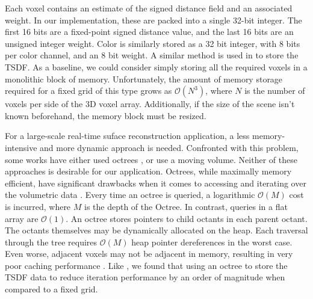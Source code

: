 \documentclass[conference]{IEEEtran}
\begin{document}
Each voxel contains an estimate of the signed distance field and an
associated weight. In our implementation, these are packed into a single 32-bit
integer. The first 16 bits are a fixed-point signed distance value, and the
last 16 bits  are an unsigned integer weight. Color is similarly
stored as a 32 bit integer, with 8 bits per color channel, and an 8 bit weight.
A similar method is used in \cite{Newcombe, Whelan2013, Bylow2013, NiessnerHashing} to store
the TSDF. As a baseline, we could consider simply storing all the required
voxels in a monolithic block of memory. Unfortunately, the amount of memory storage required
for a fixed grid of this type grows as $\mathcal{O}(N^3)$, where $N$ is the
number of voxels per side of the 3D voxel array. Additionally, if the size of
the scene isn't known beforehand, the memory block must be resized.


For a large-scale real-time suface reconstruction application, a less
memory-intensive and more dynamic approach is needed. Confronted with this
problem, some works have either used  octrees \cite{Wurm2010, Zeng2012,
Chen2012}, or use a moving volume\cite{Whelan2013}. Neither of these approaches
is desirable for our application. Octrees, while maximally memory efficient,
have significant drawbacks when it comes to accessing and iterating over the
volumetric data \cite{NiessnerHashing}. Every time an octree is queried,  a
logarithmic $\mathcal{O}(M)$ cost is incurred, where $M$ is the depth of the
Octree. In contrast, queries in a flat array are $\mathcal{O}(1)$. An octree
stores pointers to child octants in each parent octant. The octants themselves
may be dynamically allocated on the heap. Each traversal through the tree
requires $\mathcal{O}(M)$ heap pointer dereferences in the worst case.
Even worse, adjacent voxels may not be adjacent in memory, resulting in very
poor caching performance \cite{CacheStructures}.  Like \cite{NiessnerHashing},
we found that using an octree to store the TSDF data to reduce iteration
performance by an order of magnitude when compared to a fixed grid.
\end{document}

